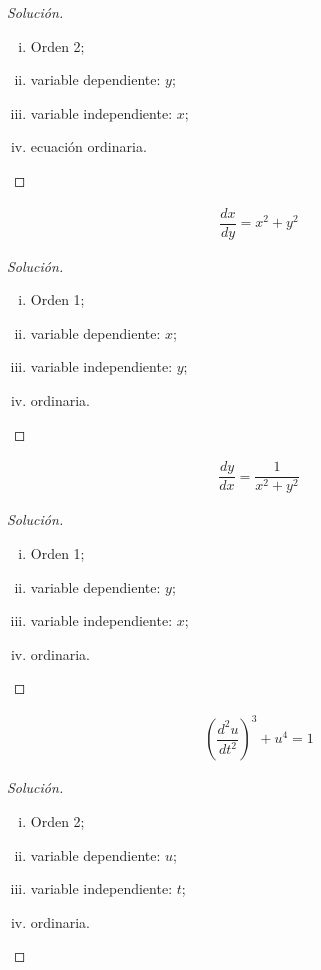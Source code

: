 \begin{proof}[Solución]
	\begin{enumerate}[(i)]
		\item Orden 2;
		\item variable dependiente: $ y $;
		\item variable independiente: $ x $;
		\item ecuación ordinaria.
	\end{enumerate}
\end{proof}


\begin{align*}
	\dfrac{dx}{dy}= x^{2}+y^{2}
\end{align*}
\begin{proof}[Solución]
	\begin{enumerate}[(i)]
		\item Orden 1;
		\item variable dependiente: $ x $;
		\item variable independiente: $ y $;
		\item ordinaria.
	\end{enumerate}
\end{proof}


\begin{align*}
	\dfrac{dy}{dx}= \dfrac{1}{x^{2}+y^{2}}
\end{align*}
\begin{proof}[Solución]
	\begin{enumerate}[(i)]
		\item Orden 1;
		\item variable dependiente: $ y $;
		\item variable independiente: $ x $;
		\item ordinaria.
	\end{enumerate}
\end{proof}


\begin{align*}
	\left(\dfrac{d^{2}u}{dt^{2}}\right)^{3}+u^{4}=1
\end{align*}
\begin{proof}[Solución]
	\begin{enumerate}[(i)]
		\item Orden 2;
		\item variable dependiente: $ u $;
		\item variable independiente: $ t $;
		\item ordinaria.
	\end{enumerate}
\end{proof}

